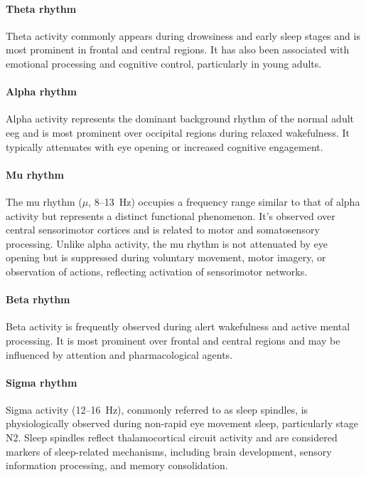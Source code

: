 \paragraph*{Theta rhythm}
Theta activity commonly appears during drowsiness and early sleep stages and is most prominent in frontal and central regions. It has also been associated with emotional processing and cognitive control, particularly in young adults.

\paragraph*{Alpha rhythm}
Alpha activity represents the dominant background rhythm of the normal adult \gls{eeg} and is most prominent over occipital regions during relaxed wakefulness. It typically attenuates with eye opening or increased cognitive engagement.

\paragraph*{Mu rhythm}
The mu rhythm ($\mu$, 8--13~Hz) occupies a frequency range similar to that of alpha activity but represents a distinct functional phenomenon. It's observed over central sensorimotor cortices and is related to motor and somatosensory processing. Unlike alpha activity, the mu rhythm is not attenuated by eye opening but is suppressed during voluntary movement, motor imagery, or observation of actions, reflecting activation of sensorimotor networks.

\paragraph*{Beta rhythm}
Beta activity is frequently observed during alert wakefulness and active mental processing. It is most prominent over frontal and central regions and may be influenced by attention and pharmacological agents.

\paragraph*{Sigma rhythm}
Sigma activity (12--16~Hz), commonly referred to as sleep spindles, is physiologically observed during non-rapid eye movement sleep, particularly stage N2. Sleep spindles reflect thalamocortical circuit activity and are considered markers of sleep-related mechanisms, including brain development, sensory information processing, and memory consolidation.

